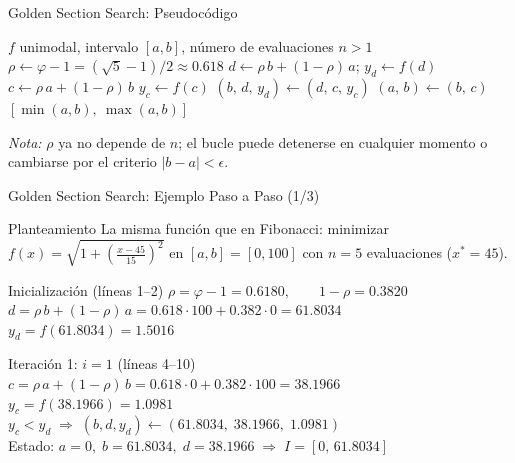 \begin{frame}{Golden Section Search: Pseudocódigo}
    \small
    \begin{algorithmic}[1]
        \Require $f$ unimodal, intervalo $[a,b]$, número de evaluaciones $n>1$
        \State $\rho \gets \varphi - 1 = (\sqrt{5}-1)/2 \approx 0.618$
        \State $d \gets \rho\, b + (1-\rho)\, a$; \quad $y_d \gets f(d)$
            \State $c \gets \rho\, a + (1-\rho)\, b$ 
            \State $y_c \gets f(c)$
                \State $(b,\, d,\, y_d) \gets (d,\, c,\, y_c)$ 
            \Else
                \State $(a,\, b) \gets (b,\, c)$ 
            \EndIf
        \EndFor
        \State \Return $[\min(a,b),\ \max(a,b)]$
    \end{algorithmic}
    \vspace{0.4em}
    {\footnotesize \textit{Nota:} $\rho$ ya no depende de $n$; el bucle puede detenerse
     en cualquier momento o cambiarse por el criterio $|b-a|<\epsilon$.}
\end{frame}

\begin{frame}{Golden Section Search: Ejemplo Paso a Paso (1/3)}
    \scriptsize
    \begin{exampleblock}{Planteamiento}
        La misma función que en Fibonacci: minimizar
        $f(x)=\sqrt{1+\left(\frac{x-45}{15}\right)^{2}}$ en $[a,b]=[0,100]$
        con $n=5$ evaluaciones ($x^{*}=45$).
    \end{exampleblock}

    \begin{block}{Inicialización (líneas 1--2)}
        $\rho=\varphi-1=0.6180,\qquad 1-\rho=0.3820$\\[2pt]
        $d=\rho\, b+(1-\rho)\, a=0.618\cdot 100+0.382\cdot 0=61.8034$\\[2pt]
        $y_d=f(61.8034)=1.5016$
    \end{block}

    \begin{block}{Iteración 1: $i=1$ (líneas 4--10)}
        $c=\rho\, a+(1-\rho)\, b=0.618\cdot 0+0.382\cdot 100=38.1966$\\[2pt]
        $y_c=f(38.1966)=1.0981$\\[2pt]
        $y_c<y_d \;\Rightarrow\; (b,d,y_d)\gets(61.8034,\;38.1966,\;1.0981)$\\[2pt]
        Estado: $a=0,\; b=61.8034,\; d=38.1966 \;\Rightarrow\; I=[0,\,61.8034]$
    \end{block}
\end{frame}

